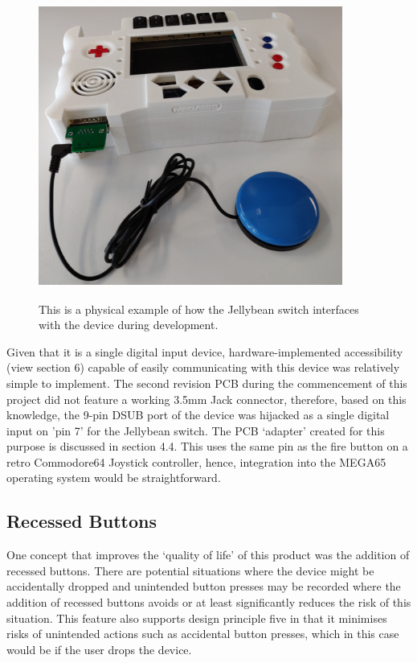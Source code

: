 \begin{figure} [h]
    \centering
    \includegraphics[width=10cm,height=10cm,keepaspectratio]{Figures/jellybean.png}
    \caption{This is a physical example of how the Jellybean switch interfaces with the device during development.}
    \label{fig:Jellybean}
\end{figure}

Given that it is a single digital input device, hardware-implemented accessibility (view section 6) capable of easily communicating with this device was relatively simple to implement. 
The second revision PCB during the commencement of this project did not feature a working 3.5mm Jack connector, therefore, based on this knowledge, the 9-pin DSUB port of the device was hijacked as a single digital input on 'pin 7' for the Jellybean switch. 
The PCB ‘adapter’ created for this purpose is discussed in section 4.4.
This uses the same pin as the fire button on a retro Commodore64 Joystick controller, hence, integration into the MEGA65 operating system would be straightforward.

\subsection{Recessed Buttons}

One concept that improves the ‘quality of life’ of this product was the addition of recessed buttons.
There are potential situations where the device might be accidentally dropped and unintended button presses may be recorded where the addition of recessed buttons avoids or at least significantly reduces the risk of this situation.
This feature also supports design principle five in that it minimises risks of unintended actions such as accidental button presses, which in this case would be if the user drops the device.

